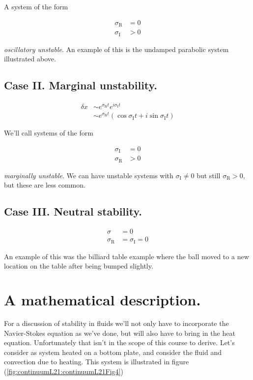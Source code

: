 A system of the form

\begin{align*}
\sigma_{\text{R}} &= 0 \\
\sigma_{\text{I}} &> 0
\end{align*}

\textit{oscillatory unstable}.  An example of this is the undamped parabolic system illustrated above.

\subsection{Case II.  Marginal unstability.}

\begin{align*}
\delta x 
&\sim e^{\sigma_{\text{R}} t} e^{i \sigma_{\text{I}} t} \\
&\sim e^{\sigma_{\text{R}} t} \left( \cos \sigma_{\text{I}} t + i \sin \sigma_{\text{I}} t \right)
\end{align*}

We'll call systems of the form

\begin{align*}
\sigma_{\text{I}} &= 0 \\
\sigma_{\text{R}} &> 0
\end{align*}

\textit{marginally unstable}.  We can have unstable systems with $\sigma_{\text{I}} \ne 0$ but still $\sigma_{\text{R}} > 0$, but these are less common.

\subsection{Case III.  Neutral stability.}

\begin{align*}
\sigma &= 0 \\
\sigma_{\text{R}} &= \sigma_{\text{I}} = 0
\end{align*}

An example of this was the billiard table example where the ball moved to a new location on the table after being bumped slightly.

\section{A mathematical description.}

For a discussion of stability in fluids we'll not only have to incorporate the Navier-Stokes equation as we've done, but will also have to bring in the heat equation.  Unfortunately that isn't in the scope of this course to derive.  Let's consider as system heated on a bottom plate, and consider the fluid and convection due to heating.  This system is illustrated in figure (\ref{fig:continuumL21:continuumL21Fig4})

